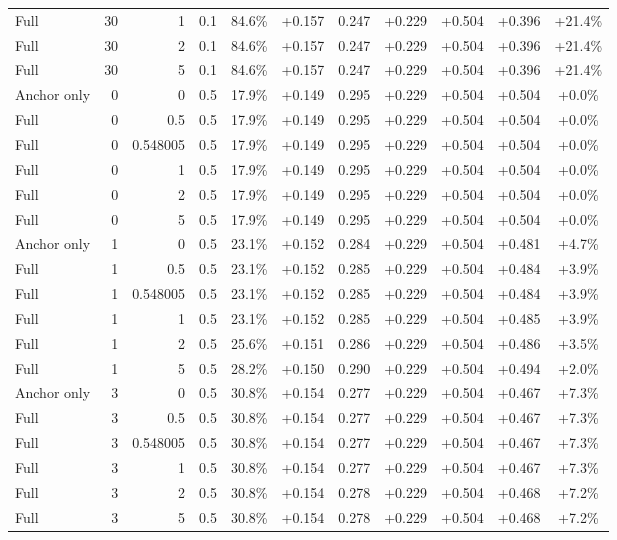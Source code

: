 \begin{table}[htbp]
\begin{tabular}{lrrrccccccc}
Full & 30 & 1 & 0.1 & 84.6\% & +0.157 & 0.247 & +0.229 & +0.504 & +0.396 & +21.4\% \\
Full & 30 & 2 & 0.1 & 84.6\% & +0.157 & 0.247 & +0.229 & +0.504 & +0.396 & +21.4\% \\
Full & 30 & 5 & 0.1 & 84.6\% & +0.157 & 0.247 & +0.229 & +0.504 & +0.396 & +21.4\% \\
Anchor only & 0 & 0 & 0.5 & 17.9\% & +0.149 & 0.295 & +0.229 & +0.504 & +0.504 & +0.0\% \\
Full & 0 & 0.5 & 0.5 & 17.9\% & +0.149 & 0.295 & +0.229 & +0.504 & +0.504 & +0.0\% \\
Full & 0 & 0.548005 & 0.5 & 17.9\% & +0.149 & 0.295 & +0.229 & +0.504 & +0.504 & +0.0\% \\
Full & 0 & 1 & 0.5 & 17.9\% & +0.149 & 0.295 & +0.229 & +0.504 & +0.504 & +0.0\% \\
Full & 0 & 2 & 0.5 & 17.9\% & +0.149 & 0.295 & +0.229 & +0.504 & +0.504 & +0.0\% \\
Full & 0 & 5 & 0.5 & 17.9\% & +0.149 & 0.295 & +0.229 & +0.504 & +0.504 & +0.0\% \\
Anchor only & 1 & 0 & 0.5 & 23.1\% & +0.152 & 0.284 & +0.229 & +0.504 & +0.481 & +4.7\% \\
Full & 1 & 0.5 & 0.5 & 23.1\% & +0.152 & 0.285 & +0.229 & +0.504 & +0.484 & +3.9\% \\
Full & 1 & 0.548005 & 0.5 & 23.1\% & +0.152 & 0.285 & +0.229 & +0.504 & +0.484 & +3.9\% \\
Full & 1 & 1 & 0.5 & 23.1\% & +0.152 & 0.285 & +0.229 & +0.504 & +0.485 & +3.9\% \\
Full & 1 & 2 & 0.5 & 25.6\% & +0.151 & 0.286 & +0.229 & +0.504 & +0.486 & +3.5\% \\
Full & 1 & 5 & 0.5 & 28.2\% & +0.150 & 0.290 & +0.229 & +0.504 & +0.494 & +2.0\% \\
Anchor only & 3 & 0 & 0.5 & 30.8\% & +0.154 & 0.277 & +0.229 & +0.504 & +0.467 & +7.3\% \\
Full & 3 & 0.5 & 0.5 & 30.8\% & +0.154 & 0.277 & +0.229 & +0.504 & +0.467 & +7.3\% \\
Full & 3 & 0.548005 & 0.5 & 30.8\% & +0.154 & 0.277 & +0.229 & +0.504 & +0.467 & +7.3\% \\
Full & 3 & 1 & 0.5 & 30.8\% & +0.154 & 0.277 & +0.229 & +0.504 & +0.467 & +7.3\% \\
Full & 3 & 2 & 0.5 & 30.8\% & +0.154 & 0.278 & +0.229 & +0.504 & +0.468 & +7.2\% \\
Full & 3 & 5 & 0.5 & 30.8\% & +0.154 & 0.278 & +0.229 & +0.504 & +0.468 & +7.2\% \\

\end{tabular}
\end{table}
